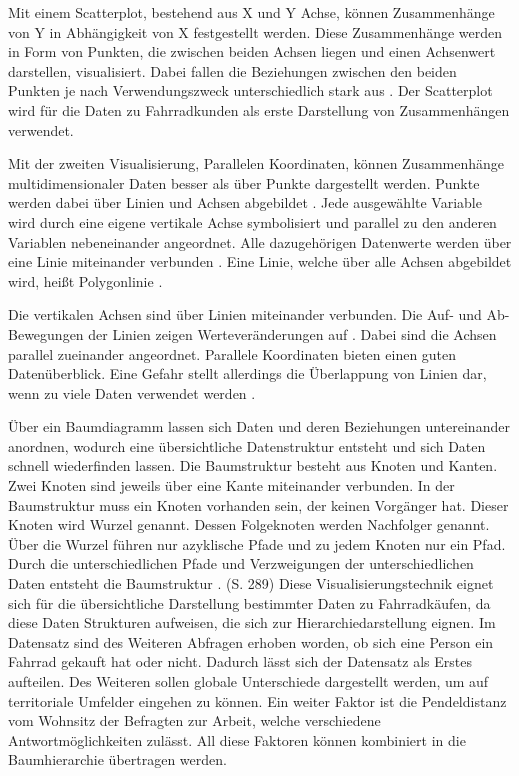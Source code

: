 \documentclass[usegeometry=true]{scrartcl}
\begin{document}
Mit einem Scatterplot, bestehend aus X und Y Achse, können Zusammenhänge von Y in Abhängigkeit von X festgestellt werden. Diese Zusammenhänge werden in Form von Punkten, die zwischen beiden Achsen liegen und einen Achsenwert darstellen, visualisiert. Dabei fallen die Beziehungen zwischen den beiden Punkten je nach  Verwendungszweck unterschiedlich stark aus \cite{Yi.16.10.2019,Anscombe.1973,Cleveland.1984}. Der Scatterplot wird für die Daten zu Fahrradkunden als erste Darstellung von Zusammenhängen verwendet. 

Mit der zweiten Visualisierung, Parallelen Koordinaten, können Zusammenhänge multidimensionaler Daten besser als über Punkte dargestellt werden. Punkte werden dabei über Linien und Achsen  abgebildet \cite{Inselberg.1990}. Jede ausgewählte Variable wird durch eine eigene vertikale Achse symbolisiert und parallel zu den anderen Variablen nebeneinander angeordnet. Alle dazugehörigen Datenwerte werden über eine Linie miteinander verbunden \cite{Moustafa.2006}. Eine Linie, welche über alle Achsen abgebildet wird, heißt Polygonlinie \cite{Heinrich.2015}. 

Die vertikalen Achsen sind über Linien miteinander verbunden. Die Auf- und Ab-Bewegungen der Linien zeigen Werteveränderungen auf \cite{Few.2008}. 
Dabei sind die Achsen parallel zueinander angeordnet. Parallele Koordinaten bieten einen guten Datenüberblick. Eine Gefahr stellt allerdings die Überlappung von Linien dar, wenn zu viele Daten verwendet werden \cite{Heinrich.2009}.

Über ein Baumdiagramm lassen sich Daten und deren Beziehungen untereinander anordnen, wodurch eine übersichtliche Datenstruktur entsteht und sich Daten schnell wiederfinden lassen. Die Baumstruktur besteht aus Knoten und Kanten. Zwei Knoten sind jeweils über eine Kante miteinander verbunden. In der Baumstruktur muss ein Knoten vorhanden sein, der keinen Vorgänger hat. Dieser Knoten wird Wurzel genannt. Dessen Folgeknoten werden Nachfolger genannt. Über die Wurzel führen nur azyklische Pfade und zu jedem Knoten nur ein Pfad. Durch die unterschiedlichen Pfade und Verzweigungen der unterschiedlichen Daten entsteht die Baumstruktur \cite{Gumm.2016}. (S. 289) Diese Visualisierungstechnik eignet sich für die übersichtliche Darstellung bestimmter Daten zu Fahrradkäufen, da diese Daten Strukturen aufweisen, die sich zur Hierarchiedarstellung eignen. Im Datensatz sind des Weiteren Abfragen erhoben worden, ob sich eine Person ein Fahrrad gekauft hat oder nicht. Dadurch lässt sich der Datensatz als Erstes aufteilen. Des Weiteren sollen globale Unterschiede dargestellt werden, um auf territoriale Umfelder eingehen zu können. Ein weiter Faktor ist die Pendeldistanz vom Wohnsitz der Befragten zur Arbeit, welche verschiedene Antwortmöglichkeiten zulässt. All diese Faktoren können kombiniert in die Baumhierarchie übertragen werden.   
\end{document}
